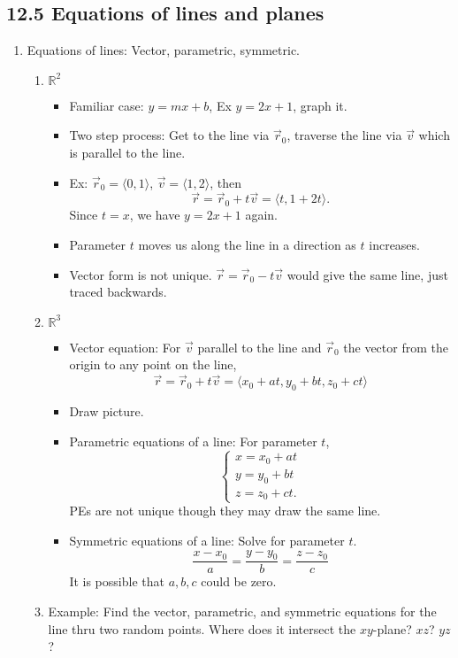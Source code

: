 \documentclass{article}
\begin{document}
\subsection{12.5 Equations of lines and planes}
\begin{enumerate}

\item Equations of lines: Vector, parametric, symmetric.
\begin{enumerate}
\item $\mathbb{R}^2$
\begin{itemize}
\item Familiar case: $y=mx+b$, Ex $y=2x+1$, graph it.
\item Two step process: Get to the line via $\vec{r}_0$, traverse the line via $\vec{v}$ which is parallel to the line.
\item Ex: $\vec{r}_0 = \langle 0,1 \rangle$, $\vec{v} = \langle 1,2 \rangle$, then
\[
\vec{r} = \vec{r}_0 + t\vec{v} = \langle t, 1+2t \rangle.
\]
Since $t=x$, we have $y=2x+1$ again.
\item Parameter $t$ moves us along the line in a direction as $t$ increases. \item Vector form is not unique. $\vec{r}=\vec{r}_0-t\vec{v}$ would give the same line, just traced backwards.
\end{itemize}
\item $\mathbb{R}^3$
\begin{itemize}
\item Vector equation: For $\vec{v}$ parallel to the line and $\vec{r}_0$ the vector from the origin to any point on the line,
\[
\vec{r} = \vec{r}_0 + t\vec{v} = \langle x_0+at, y_0+bt, z_0+ct \rangle
\]
\item Draw picture.
\item Parametric equations of a line: For parameter $t$,
\[
\begin{cases}
x=x_0+at \\
y=y_0+bt \\
z=z_0+ct.
\end{cases}
\]
PEs are not unique though they may draw the same line. 
\item Symmetric equations of a line: Solve for parameter $t$.
\[
\frac{x-x_0}{a} = \frac{y-y_0}{b} = \frac{z-z_0}{c} 
\]
It is possible that $a,b,c$ could be zero.
\end{itemize}

\item Example: Find the vector, parametric, and symmetric equations for the line thru two random points. Where does it intersect the $xy$-plane? $xz$? $yz$?


\end{enumerate}
\end{enumerate}
\end{document}
